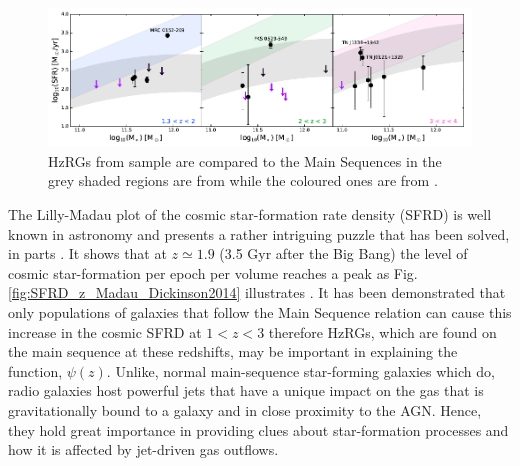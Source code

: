 \documentclass[10pt,a4paper]{article}
\begin{document}
\begin{figure}[!ht]
   \centering
   \includegraphics[width=\textwidth]{plots_chp1/HzRGs_main_sequence_Falkendal2019.png}
   \caption[HzRGs relative to Main Sequence in \citet{Falkendal2019}]{HzRGs from \citet{Falkendal2019} sample are compared to the Main Sequences in the grey shaded regions are from \citet{Schreiber2015} while the coloured ones are from \citet{Santini2017}. }
   \label{fig:HzRGs-MS-Falkendal2019}
\end{figure}

The Lilly-Madau plot of the cosmic star-formation rate density (SFRD) is well known in astronomy and presents a rather intriguing puzzle that has been solved, in parts \citep{Lilly1995,Madau1996}. It shows that at $z \simeq 1.9$ (3.5 Gyr after the Big Bang) the level of cosmic star-formation per epoch per volume reaches a peak as Fig. \ref{fig:SFRD_z_Madau_Dickinson2014} illustrates \citep{MadauDickinson2014}. It has been demonstrated that only populations of galaxies that follow the Main Sequence relation can cause this increase in the cosmic SFRD at $1 < z < 3$ therefore HzRGs, which are found on the main sequence at these redshifts, may be important in explaining the function, $\psi(z).$ Unlike, normal main-sequence star-forming galaxies which do, radio galaxies host powerful jets that have a unique impact on the gas that is gravitationally bound to a galaxy and in close proximity to the AGN. Hence, they hold great importance in providing clues about star-formation processes and how it is affected by jet-driven gas outflows. 
\end{document}
